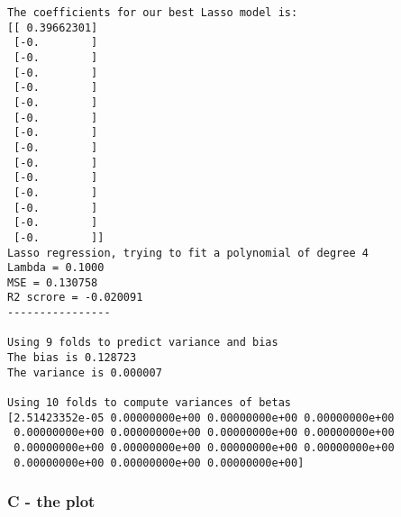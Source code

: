 \documentclass[11pt]{article}
\begin{document}
    \begin{Verbatim}[commandchars=\\\{\}]
The coefficients for our best Lasso model is:
[[ 0.39662301]
 [-0.        ]
 [-0.        ]
 [-0.        ]
 [-0.        ]
 [-0.        ]
 [-0.        ]
 [-0.        ]
 [-0.        ]
 [-0.        ]
 [-0.        ]
 [-0.        ]
 [-0.        ]
 [-0.        ]
 [-0.        ]]
Lasso regression, trying to fit a polynomial of degree 4 
Lambda = 0.1000
MSE = 0.130758
R2 scrore = -0.020091
----------------

Using 9 folds to predict variance and bias
The bias is 0.128723
The variance is 0.000007

Using 10 folds to compute variances of betas
[2.51423352e-05 0.00000000e+00 0.00000000e+00 0.00000000e+00
 0.00000000e+00 0.00000000e+00 0.00000000e+00 0.00000000e+00
 0.00000000e+00 0.00000000e+00 0.00000000e+00 0.00000000e+00
 0.00000000e+00 0.00000000e+00 0.00000000e+00]

    \end{Verbatim}

    \subsubsection{C - the plot}\label{c---the-plot}
\end{document}
